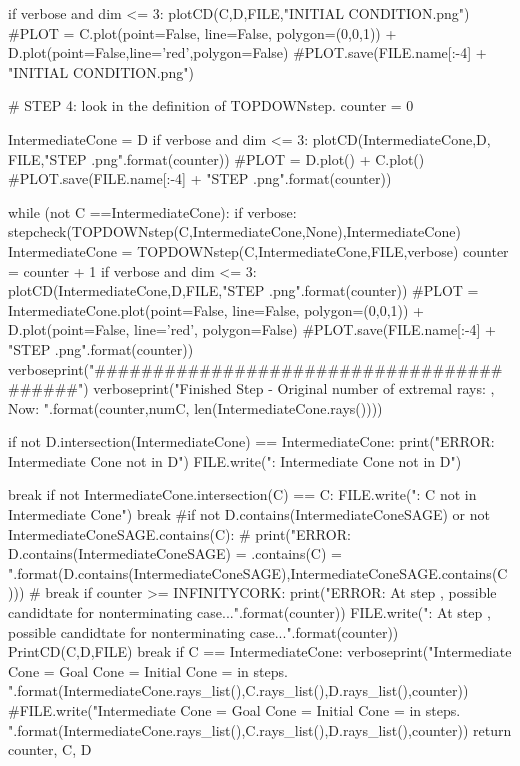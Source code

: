 \documentclass{TC}
\begin{document}
\begin{SAGE}
	if verbose and dim <= 3:
		plotCD(C,D,FILE,"INITIAL CONDITION.png")
		#PLOT = C.plot(point=False, line=False, polygon=(0,0,1)) + D.plot(point=False,line='red',polygon=False)
		#PLOT.save(FILE.name[:-4] + "INITIAL CONDITION.png")

	# STEP 4: look in the definition of TOPDOWNstep.
	counter = 0
	
	IntermediateCone = D
	if verbose and dim <= 3:
		plotCD(IntermediateCone,D, FILE,"STEP {}.png".format(counter))
		#PLOT = D.plot() + C.plot()
		#PLOT.save(FILE.name[:-4] + "STEP {}.png".format(counter))
	

	while (not C ==IntermediateCone):
		if verbose:
			stepcheck(TOPDOWNstep(C,IntermediateCone,None),IntermediateCone)
		IntermediateCone = TOPDOWNstep(C,IntermediateCone,FILE,verbose)
		counter = counter + 1
		if verbose and dim <= 3:
			plotCD(IntermediateCone,D,FILE,"STEP {}.png".format(counter))
			#PLOT = IntermediateCone.plot(point=False, line=False, polygon=(0,0,1)) + D.plot(point=False, line='red', polygon=False)
			#PLOT.save(FILE.name[:-4] + "STEP {}.png".format(counter))
		verboseprint("#########################################")
		verboseprint("Finished Step {} - Original number of extremal rays: {}, Now: {}".format(counter,numC, len(IntermediateCone.rays())))
		
		if not D.intersection(IntermediateCone) == IntermediateCone:
			print("ERROR: Intermediate Cone not in D")
			FILE.write("\nERROR: Intermediate Cone not in D")
			
			break
		if not IntermediateCone.intersection(C) == C:
			FILE.write("\nERROR: C not in Intermediate Cone")
			break
		#if not D.contains(IntermediateConeSAGE) or not IntermediateConeSAGE.contains(C):
		#	print("ERROR: D.contains(IntermediateConeSAGE) = {} \nIntermediateConeSAGE.contains(C) = {}".format(D.contains(IntermediateConeSAGE),IntermediateConeSAGE.contains(C)))
		#	break
		if counter >= INFINITYCORK:
			print("ERROR: At step {}, possible candidtate for nonterminating case...".format(counter))
			FILE.write("\nERROR: At step {}, possible candidtate for nonterminating case...".format(counter))
			PrintCD(C,D,FILE)
			break
	if C == IntermediateCone:
		verboseprint("\n Intermediate Cone = \n{}\n Goal Cone = \n{}\n Initial Cone = \n{}\n\tFinished in {} steps. ".format(IntermediateCone.rays_list(),C.rays_list(),D.rays_list(),counter))
		#FILE.write("\n Intermediate Cone = \n{}\n Goal Cone = \n{}\n Initial Cone = \n{}\n\tFinished in {} steps. ".format(IntermediateCone.rays_list(),C.rays_list(),D.rays_list(),counter))
	return counter, C, D 
\end{SAGE}
\end{document}
